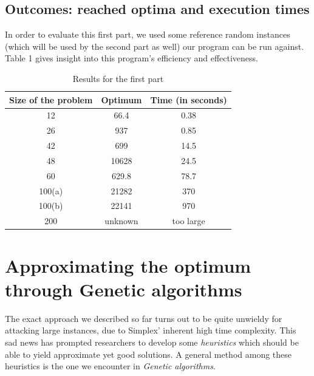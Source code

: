 \documentclass[letterpaper, 10 pt, conference]{ieeeconf}  %
\begin{document}
\subsection{Outcomes: reached optima and execution times}
In order to evaluate this first part, we used some reference random instances (which will be used by the second part as well) our program can be run against. \newline Table 1  gives insight into this program's efficiency and effectiveness.
\begin{table}[h]
\caption{Results for the first part}
\label{table_example}
\begin{center}
\begin{tabular}{|c|c|c|}
\hline
\textbf{Size of the problem} & \textbf{Optimum} & \textbf{Time (in seconds)} \\
\hline
12 &  66.4 &  0.38\\
\hline
26 & 937 & 0.85 \\
\hline
42 & 699 & 14.5\\
\hline
48 & 10628 & 24.5 \\
\hline
60 & 629.8 & 78.7 \\
\hline
100(a) & 21282 & 370 \\
\hline
100(b) & 22141 & 970 \\
\hline
200 & unknown & too large\\
\hline
\end{tabular}
\end{center}
\end{table}

\section{Approximating the optimum through Genetic algorithms}
The exact approach we described so far turns out to be quite unwieldy for attacking large instances, due to Simplex' inherent high time complexity.  
This sad news has prompted researchers to develop some \textit{heuristics} 
which should be able to yield approximate yet good solutions. A general method among these heuristics is the one we encounter in \textit{Genetic algorithms}.
\end{document}
